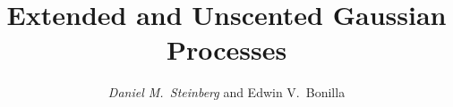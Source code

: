 \documentclass{beamer}
\begin{document}

\title[Extended and Unscented GPs]{Extended and Unscented Gaussian Processes}
\author[D. Steinberg \& E. Bonilla]{\textit{Daniel M.\ Steinberg} and
        Edwin V.\ Bonilla}

\date{}


\begin{frame}
    \titlepage
\end{frame}


\end{document}
